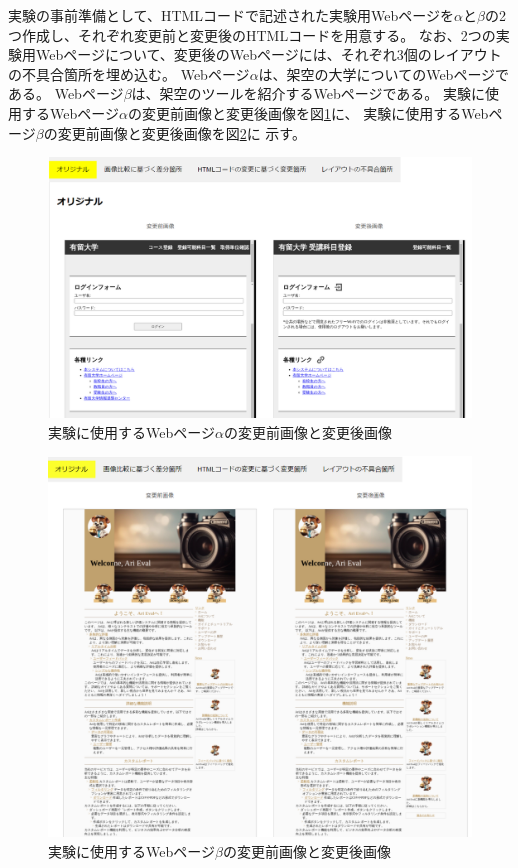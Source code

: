 実験の事前準備として、HTMLコードで記述された実験用Webページを$\alpha$と$\beta$の2つ作成し、それぞれ変更前と変更後のHTMLコードを用意する。
なお、2つの実験用Webページについて、変更後のWebページには、それぞれ3個のレイアウトの不具合箇所を埋め込む。
Webページ$\alpha$は、架空の大学についてのWebページである。
Webページ$\beta$は、架空のツールを紹介するWebページである。
実験に使用するWebページ$\alpha$の変更前画像と変更後画像を図\ref{fig:test1}に、
実験に使用するWebページ$\beta$の変更前画像と変更後画像を図\ref{fig:test2}に
示す。
\begin{figure}[tp]
    \centering
    \includegraphics[width=1.0\textwidth]{image/5/new_original.png}
    \caption{実験に使用するWebページ$\alpha$の変更前画像と変更後画像}
    \label{fig:test1}
\end{figure}
\begin{figure}[tp]
    \centering
    \includegraphics[width=1.0\textwidth]{image/6/test_beta.png}
    \caption{実験に使用するWebページ$\beta$の変更前画像と変更後画像}
    \label{fig:test2}
\end{figure}
